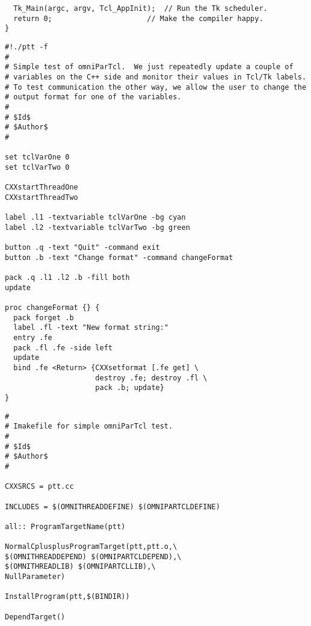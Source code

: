 \documentclass[11pt]{article}
\begin{document}
\begin{verbatim}
  Tk_Main(argc, argv, Tcl_AppInit);  // Run the Tk scheduler.
  return 0;	                     // Make the compiler happy.
}
\end{verbatim}


\newpage
\begin{verbatim}
#!./ptt -f
#
# Simple test of omniParTcl.  We just repeatedly update a couple of 
# variables on the C++ side and monitor their values in Tcl/Tk labels.
# To test communication the other way, we allow the user to change the
# output format for one of the variables.
#
# $Id$
# $Author$
#

set tclVarOne 0
set tclVarTwo 0

CXXstartThreadOne
CXXstartThreadTwo

label .l1 -textvariable tclVarOne -bg cyan
label .l2 -textvariable tclVarTwo -bg green

button .q -text "Quit" -command exit
button .b -text "Change format" -command changeFormat

pack .q .l1 .l2 .b -fill both
update

proc changeFormat {} {
  pack forget .b  
  label .fl -text "New format string:"
  entry .fe 
  pack .fl .fe -side left
  update
  bind .fe <Return> {CXXsetformat [.fe get] \
                     destroy .fe; destroy .fl \
                     pack .b; update}
}
\end{verbatim}


\newpage
\begin{verbatim}
#
# Imakefile for simple omniParTcl test.
#
# $Id$
# $Author$
#

CXXSRCS = ptt.cc

INCLUDES = $(OMNITHREADDEFINE) $(OMNIPARTCLDEFINE)

all:: ProgramTargetName(ptt)

NormalCplusplusProgramTarget(ptt,ptt.o,\
$(OMNITHREADDEPEND) $(OMNIPARTCLDEPEND),\
$(OMNITHREADLIB) $(OMNIPARTCLLIB),\
NullParameter)

InstallProgram(ptt,$(BINDIR))

DependTarget()
\end{verbatim}
\end{document}
